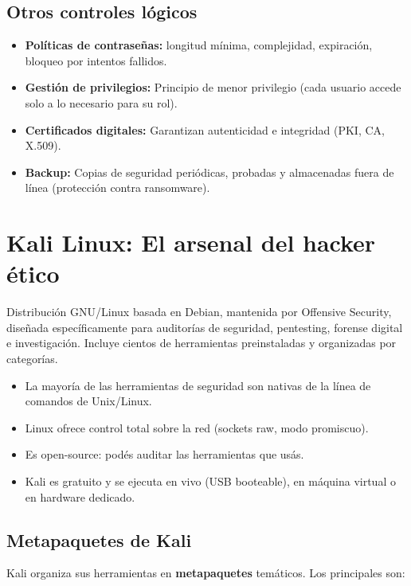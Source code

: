 \documentclass[11pt,a4paper]{article}
\begin{document}
\subsection{Otros controles lógicos}
\begin{itemize}[leftmargin=*]
  \item \textbf{Políticas de contraseñas:} longitud mínima, complejidad, expiración, bloqueo por intentos fallidos.
  \item \textbf{Gestión de privilegios:} Principio de menor privilegio (cada usuario accede solo a lo necesario para su rol).
  \item \textbf{Certificados digitales:} Garantizan autenticidad e integridad (PKI, CA, X.509).
  \item \textbf{Backup:} Copias de seguridad periódicas, probadas y almacenadas fuera de línea (protección contra ransomware).
\end{itemize}

\section{Kali Linux: El arsenal del hacker ético}

\begin{definicion}
Distribución GNU/Linux basada en Debian, mantenida por Offensive Security, diseñada específicamente para auditorías de seguridad, pentesting, forense digital e investigación. Incluye cientos de herramientas preinstaladas y organizadas por categorías.
\end{definicion}

\begin{clave}
\begin{itemize}[leftmargin=*]
  \item La mayoría de las herramientas de seguridad son nativas de la línea de comandos de Unix/Linux.
  \item Linux ofrece control total sobre la red (sockets raw, modo promiscuo).
  \item Es open-source: podés auditar las herramientas que usás.
  \item Kali es gratuito y se ejecuta en vivo (USB booteable), en máquina virtual o en hardware dedicado.
\end{itemize}
\end{clave}

\subsection{Metapaquetes de Kali}
Kali organiza sus herramientas en \textbf{metapaquetes} temáticos. Los principales son:
\end{document}
